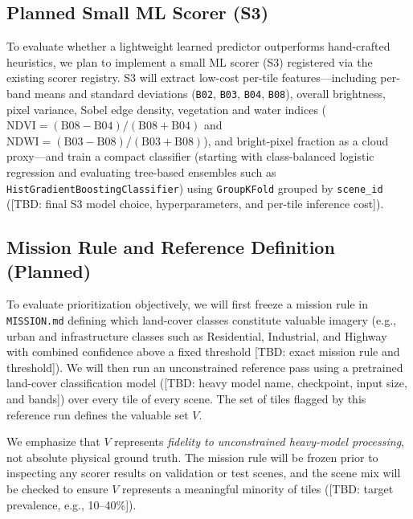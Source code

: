 \documentclass[conference]{IEEEtran}
\begin{document}
\subsection{Planned Small ML Scorer (S3)}
To evaluate whether a lightweight learned predictor outperforms hand-crafted heuristics, we plan to implement a small ML scorer (S3) registered via the existing scorer registry. S3 will extract low-cost per-tile features---including per-band means and standard deviations (\texttt{B02}, \texttt{B03}, \texttt{B04}, \texttt{B08}), overall brightness, pixel variance, Sobel edge density, vegetation and water indices ($\text{NDVI} = (\text{B08}-\text{B04})/(\text{B08}+\text{B04})$ and $\text{NDWI} = (\text{B03}-\text{B08})/(\text{B03}+\text{B08})$), and bright-pixel fraction as a cloud proxy---and train a compact classifier (starting with class-balanced logistic regression and evaluating tree-based ensembles such as \texttt{HistGradientBoostingClassifier}) using \texttt{GroupKFold} grouped by \texttt{scene\_id} ([TBD: final S3 model choice, hyperparameters, and per-tile inference cost]).

\subsection{Mission Rule and Reference Definition (Planned)}
To evaluate prioritization objectively, we will first freeze a mission rule in \texttt{MISSION.md} defining which land-cover classes constitute valuable imagery (e.g., urban and infrastructure classes such as Residential, Industrial, and Highway with combined confidence above a fixed threshold [TBD: exact mission rule and threshold]). We will then run an unconstrained reference pass using a pretrained land-cover classification model ([TBD: heavy model name, checkpoint, input size, and bands]) over every tile of every scene. The set of tiles flagged by this reference run defines the valuable set $V$.

We emphasize that $V$ represents \emph{fidelity to unconstrained heavy-model processing}, not absolute physical ground truth. The mission rule will be frozen prior to inspecting any scorer results on validation or test scenes, and the scene mix will be checked to ensure $V$ represents a meaningful minority of tiles ([TBD: target prevalence, e.g., 10--40\%]).
\end{document}
